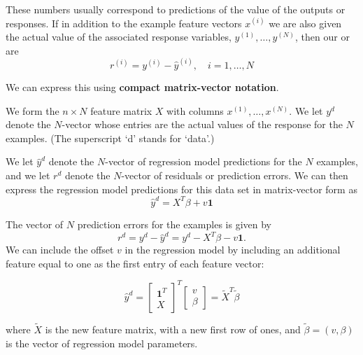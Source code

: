 These numbers usually correspond to predictions of the value of the outputs or responses. If in addition to the example feature vectors $ x^{(i)} $ we are also given the actual value of the associated response variables, $ y^{(1)}, \ldots, y^{(N)} $, then our  or  are
\begin{equation}
r^{(i)}=y^{(i)}-\hat{y}^{(i)}, \quad i=1, \ldots, N
\end{equation}

We can express this using \textbf{compact matrix-vector notation}. 

We form the $ n \times N $ feature matrix $ X $ with columns $ x^{(1)}, \ldots, x^{(N)} $. We let $ y^{{d}} $ denote the $ N $-vector whose entries are the actual values of the response for the $ N $ examples. (The superscript `d' stands for `data'.) 

We let $ \hat{y}^{{d}} $ denote the $ N $-vector of regression model predictions for the $ N $ examples, and we let $ r^{{d}} $ denote the $ N $-vector of residuals or prediction errors. We can then express the regression model predictions for this data set in matrix-vector form as
\begin{equation}
\hat{y}^{{d}}=X^{T} \beta+v \mathbf{1}
\end{equation}

The vector of $ N $ prediction errors for the examples is given by
\begin{equation}
r^{{d}}=y^{{d}}-\hat{y}^{{d}}=y^{{d}}-X^{T} \beta-v \mathbf{1} .
\end{equation}
We can include the offset $ v $ in the regression model by including an additional feature equal to one as the first entry of each feature vector:

\begin{problem}
    \begin{equation}
\hat{y}^{{d}}=\left[\begin{array}{c}
\mathbf{1}^{T} \\
X
\end{array}\right]^{T}\left[\begin{array}{l}
v \\
\beta
\end{array}\right]=\tilde{X}^{T} \tilde{\beta}
\end{equation}

where $ \tilde{X} $ is the new feature matrix, with a new first row of ones, and $ \tilde{\beta}=(v, \beta) $ is the vector of regression model parameters.
\end{problem}

